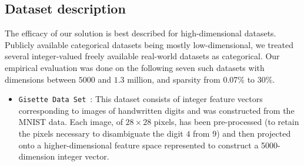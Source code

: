 \subsection{Dataset description}
The efficacy of our solution is best described for high-dimensional datasets. Publicly available categorical datasets being mostly low-dimensional, we treated several integer-valued freely available real-world datasets as categorical. Our empirical evaluation was done on the following seven such datasets with dimensions between $5000$ and $1.3$ million, and sparsity from $0.07\%$ to 30\%.%
\begin{itemize}
    \item \texttt{Gisette Data Set}~\cite{UCI,Gisette}: %
	This dataset consists of integer feature vectors corresponding to images of handwritten digits and was constructed from the MNIST data. Each image, of $28 \times 28$ pixels, has been pre-processed (to retain the pixels necessary to disambiguate the digit $4$ from $9$) and then projected onto a higher-dimensional feature space represented to construct a 5000-dimension integer vector. %
   

\end{itemize}
